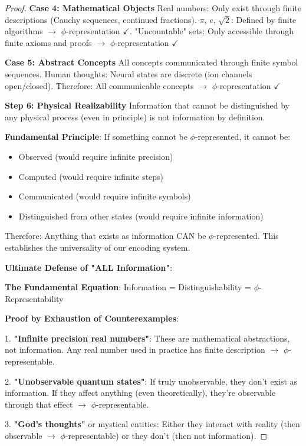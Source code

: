\documentclass[12pt,letterpaper]{article}
\begin{document}
\begin{proof}
\textbf{Case 4: Mathematical Objects}
Real numbers: Only exist through finite descriptions (Cauchy sequences, continued fractions). $\pi$, $e$, $\sqrt{2}$: Defined by finite algorithms $\to$ $\phi$-representation $\checkmark$. "Uncountable" sets: Only accessible through finite axioms and proofs $\to$ $\phi$-representation $\checkmark$

\textbf{Case 5: Abstract Concepts}
All concepts communicated through finite symbol sequences. Human thoughts: Neural states are discrete (ion channels open/closed). Therefore: All communicable concepts $\to$ $\phi$-representation $\checkmark$

\textbf{Step 6: Physical Realizability}
Information that cannot be distinguished by any physical process (even in principle) is not information by definition.

\textbf{Fundamental Principle}: If something cannot be $\phi$-represented, it cannot be:
\begin{itemize}
\item Observed (would require infinite precision)
\item Computed (would require infinite steps)  
\item Communicated (would require infinite symbols)
\item Distinguished from other states (would require infinite information)
\end{itemize}

Therefore: Anything that exists as information CAN be $\phi$-represented. This establishes the universality of our encoding system.

\textbf{Ultimate Defense of "ALL Information"}:

\textbf{The Fundamental Equation}: Information = Distinguishability = $\phi$-Representability

\textbf{Proof by Exhaustion of Counterexamples}:

1. \textbf{"Infinite precision real numbers"}: These are mathematical abstractions, not information. Any real number used in practice has finite description $\to$ $\phi$-representable.

2. \textbf{"Unobservable quantum states"}: If truly unobservable, they don't exist as information. If they affect anything (even theoretically), they're observable through that effect $\to$ $\phi$-representable.

3. \textbf{"God's thoughts"} or mystical entities: Either they interact with reality (then observable $\to$ $\phi$-representable) or they don't (then not information).


\end{proof}
\end{document}
